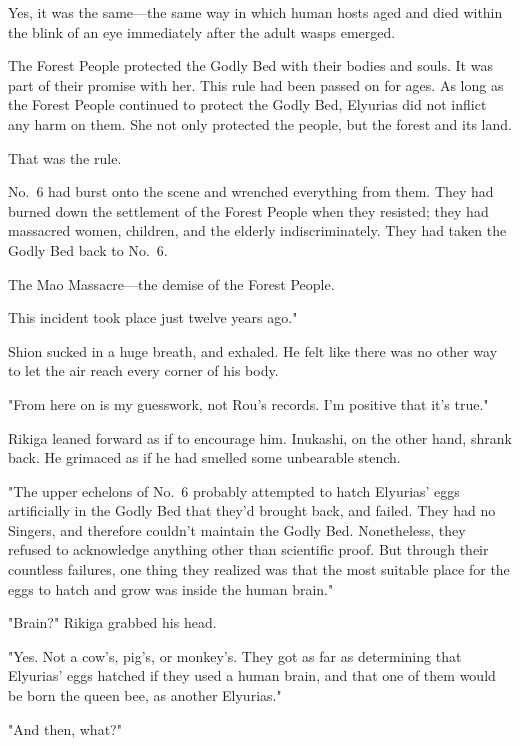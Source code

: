 Yes, it was the same---the same way in which human hosts aged and died
within the blink of an eye immediately after the adult wasps emerged.

The Forest People protected the Godly Bed with their bodies and souls.
It was part of their promise with her. This rule had been passed on for
ages. As long as the Forest People continued to protect the Godly Bed,
Elyurias did not inflict any harm on them. She not only protected the
people, but the forest and its land.

That was the rule.

No.~6 had burst onto the scene and wrenched everything from them. They
had burned down the settlement of the Forest People when they resisted;
they had massacred women, children, and the elderly indiscriminately.
They had taken the Godly Bed back to No.~6.

The Mao Massacre---the demise of the Forest People.

This incident took place just twelve years ago."

Shion sucked in a huge breath, and exhaled. He felt like there was no
other way to let the air reach every corner of his body.

"From here on is my guesswork, not Rou's records. I'm positive that it's
true."

Rikiga leaned forward as if to encourage him. Inukashi, on the other
hand, shrank back. He grimaced as if he had smelled some unbearable
stench.

"The upper echelons of No.~6 probably attempted to hatch Elyurias' eggs
artificially in the Godly Bed that they'd brought back, and failed. They
had no Singers, and therefore couldn't maintain the Godly Bed.
Nonetheless, they refused to acknowledge anything other than scientific
proof. But through their countless failures, one thing they realized was
that the most suitable place for the eggs to hatch and grow was inside
the human brain."

"Brain?" Rikiga grabbed his head.

"Yes. Not a cow's, pig's, or monkey's. They got as far as determining
that Elyurias' eggs hatched if they used a human brain, and that one of
them would be born the queen bee, as another Elyurias."

"And then, what\el ?"

